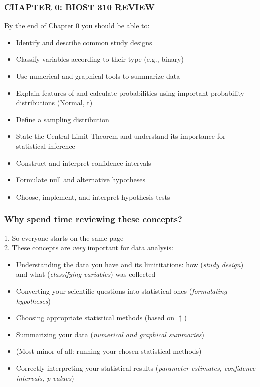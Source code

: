 \documentclass[12pt, 
hyperref={colorlinks=true, linkcolor=blue, urlcolor=cyan}]{beamer}
\begin{document}
\setcounter{framenumber}{\value{chap0}}

\begin{frame} 
\frametitle{CHAPTER 0: BIOST 310 REVIEW}
By the end of Chapter 0 you should be able to: \vspace{-0.2cm}
\begin{itemize}
\item Identify and describe common study designs
\item Classify variables according to their type (e.g., binary)
\item Use numerical and graphical tools to summarize data
\item Explain features of and calculate probabilities using important probability distributions (Normal, t)
\item Define a sampling distribution
\item State the Central Limit Theorem and understand its importance for statistical inference
\item Construct and interpret confidence intervals
\item Formulate null and alternative hypotheses
\item Choose, implement, and interpret hypothesis tests
\end{itemize}
\end{frame}

\begin{frame}
\frametitle{Why spend time reviewing these concepts?} %
1. So everyone starts on the same page \\
2. These concepts are \textit{very} important for data analysis: \vspace{-0.35cm} %
	\begin{itemize} \small \itemsep -0.5pt
	\item Understanding the data you have and its limititations: how (\textit{study design}) and what  (\textit{classifying variables}) was collected
	\item Converting your scientific questions into statistical ones (\textit{formulating hypotheses})
	\item Choosing appropriate statistical methods (based on $\uparrow$) 
	\item Summarizing your data (\textit{numerical and graphical summaries})
	\item \begin{footnotesize} (Most minor of all: running your chosen statistical methods) \end{footnotesize}
	\item Correctly interpreting your statistical results (\textit{parameter estimates, confidence intervals, p-values})
	\end{itemize}
\end{frame}
\end{document}
